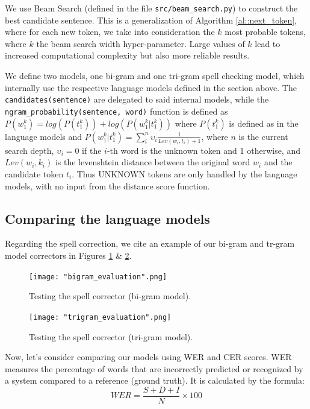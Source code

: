 \documentclass[11pt, a4paper]{article}
\begin{document}
	We use Beam Search (defined in the file \texttt{src/beam\_search.py}) to construct the best candidate sentence. This is a generalization of Algorithm \ref{al::next_token}, where for each new token, we take into consideration the $k$ most probable tokens, where $k$ the beam search width hyper-parameter. Large values of $k$ lead to increased computational complexity but also more reliable results.
	
	We define two models, one bi-gram and one tri-gram spell checking model, which internally use the respective language models defined in the section above. The \texttt{candidates(sentence)} are delegated to said internal models, while the \texttt{ngram\_probability(sentence, word)} function is defined as $P(w^{k}_1) =log(P(t^k_1)) + log(P(w^{k}_1 | t^k_1))$ where $P(t^k_1)$ is defined as in the language models and $ P(w^{k}_1 | t^k_1) = \sum^n_i \upsilon_i \frac{1}{Lev(w_i, t_i) + 1}$, where $n$ is the current search depth, $\upsilon_i = 0$ if the $i$-th word is the unknown token and 1 otherwise, and $Lev(w_i, k_i)$ is the levenshtein distance between the original word $w_i$ and the candidate token $t_i$. Thus UNKNOWN tokens are only handled by the language models, with no input from the distance score function.

	
	\subsection{Comparing the language models}
	
	Regarding the spell correction, we cite an example of our bi-gram and tr-gram model correctors in Figures \ref{fig::spell_check_example_bigram} \& \ref{fig::spell_check_example_trigram}.
	
	 \begin{figure}
	    \centering
	    \texttt{[image: "bigram\_evaluation".png]}
	    \caption{Testing the spell corrector (bi-gram model).}
	    \label{fig::spell_check_example_bigram}
	\end{figure}

	\begin{figure}
	    \centering
	    \texttt{[image: "trigram\_evaluation".png]}
	    \caption{Testing the spell corrector (tri-gram model).}
	    \label{fig::spell_check_example_trigram}
	\end{figure}


     Now, let's consider comparing our models using WER and CER scores. WER measures the percentage of words that are incorrectly predicted or recognized by a system compared to a reference (ground truth). It is calculated by the formula: 
      \[  WER = \frac{S + D + I}{N} \times 100 \]
\end{document}
